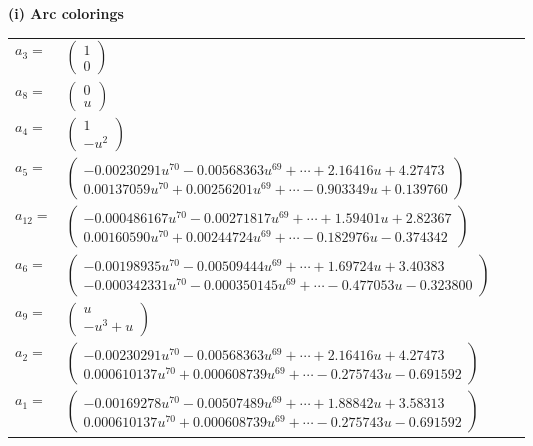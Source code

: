 \documentclass[1p]{elsarticle_modified}
\theoremstyle{definition}
\begin{document}
\flushleft \textbf{(i) Arc colorings}\\
\begin{tabular}{m{7pt} m{180pt} m{7pt} m{180pt} }
\flushright $a_{3}=$&$\begin{pmatrix}1\\0\end{pmatrix}$ \\
\flushright $a_{8}=$&$\begin{pmatrix}0\\u\end{pmatrix}$ \\
\flushright $a_{4}=$&$\begin{pmatrix}1\\- u^2\end{pmatrix}$ \\
\flushright $a_{5}=$&$\begin{pmatrix}-0.00230291 u^{70}-0.00568363 u^{69}+\cdots+2.16416 u+4.27473\\0.00137059 u^{70}+0.00256201 u^{69}+\cdots-0.903349 u+0.139760\end{pmatrix}$ \\
\flushright $a_{12}=$&$\begin{pmatrix}-0.000486167 u^{70}-0.00271817 u^{69}+\cdots+1.59401 u+2.82367\\0.00160590 u^{70}+0.00244724 u^{69}+\cdots-0.182976 u-0.374342\end{pmatrix}$ \\
\flushright $a_{6}=$&$\begin{pmatrix}-0.00198935 u^{70}-0.00509444 u^{69}+\cdots+1.69724 u+3.40383\\-0.000342331 u^{70}-0.000350145 u^{69}+\cdots-0.477053 u-0.323800\end{pmatrix}$ \\
\flushright $a_{9}=$&$\begin{pmatrix}u\\- u^3+u\end{pmatrix}$ \\
\flushright $a_{2}=$&$\begin{pmatrix}-0.00230291 u^{70}-0.00568363 u^{69}+\cdots+2.16416 u+4.27473\\0.000610137 u^{70}+0.000608739 u^{69}+\cdots-0.275743 u-0.691592\end{pmatrix}$ \\
\flushright $a_{1}=$&$\begin{pmatrix}-0.00169278 u^{70}-0.00507489 u^{69}+\cdots+1.88842 u+3.58313\\0.000610137 u^{70}+0.000608739 u^{69}+\cdots-0.275743 u-0.691592\end{pmatrix}$ \\

\end{tabular}
\end{document}
